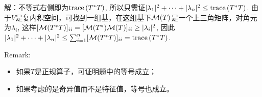 \documentclass[hyperref,]{ctexart}
\providecommand{\tightlist}{%
  \setlength{\itemsep}{0pt}\setlength{\parskip}{0pt}}
\begin{document}
\smallskip

\noindent{} 解：不等式右侧即为\(\mathrm{trace}\,(T^*T)\),
所以只需证\(|\lambda_1|^2+\cdots+|\lambda_n|^2\le \mathrm{trace}\,(T^*T)\).
由于\(V\)是复内积空间，可找到一组基，在这组基下\(\mathcal{M}(T)\)是一个上三角矩阵，对角元为\(\lambda_i\),
这样\([\mathcal{M}(T^*T)]_{ii}=[\mathcal{M}(T^*)\mathcal{M}(T)]_{ii}\ge|\lambda_i|^2\),
因此\(|\lambda_1|^2+\cdots+|\lambda_n|^2\le \sum_{i=1}^n[\mathcal{M}(T^*T)]_{ii}=\mathrm{trace}\,(T^*T)\).

\smallskip

\noindent{} Remark:

\begin{itemize}
\tightlist
\item
  如果\(T\)是正规算子，可证明题中的等号成立；
\item
  如果考虑的是奇异值而不是特征值，等号也成立。
\end{itemize}

\bigskip
\end{document}
